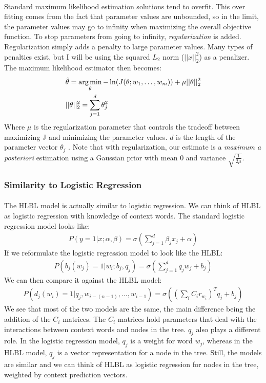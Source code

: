 \paragraph{}
Standard maximum likelihood estimation solutions tend to overfit. This over fitting comes from the fact that parameter values are unbounded, so in the limit, the parameter values may go to infinity when maximizing the overall objective function. To stop parameters from going to infinity, \emph{regularization} is added. Regularization simply adds a penalty to large parameter values. Many types of penalties exist, but I will be using the squared $L_2$ norm ($||x||^2_2$) as a penalizer. The maximum likelihood estimator then becomes:
\begin{align}
&\hat{\theta} = \operatorname*{arg\,min}_\theta -\ln(J(\theta;w_1,\dots, w_m)) +  \mu ||\theta||^2_2
\\
& ||\theta||^2_2 = \sum_{j=1}^d \theta_j^2 \nonumber
\end{align}
Where $\mu$ is the regularization parameter that controls the tradeoff between maximizing J and minimizing the parameter values. $d$ is the length of the parameter vector $\theta_j$ \cite{Elkan2013}. Note that with regularization, our estimate is a \emph{maximum a posteriori} estimation using a Gaussian prior with mean 0 and variance $\sqrt{\frac{1}{2\mu}}$.

\subsubsection{Similarity to Logistic Regression}
\paragraph{}
The HLBL model is actually similar to logistic regression. We can think of HLBL as logistic regression with knowledge of context words. 
The standard logistic regression model looks like:
\begin{align}
P(y =1 | x; \alpha, \beta) = \sigma \left( \sum_{j=1}^d \beta_j x_j + \alpha \right)
\end{align}
If we reformulate the logistic regression model to look like the HLBL:
\begin{align}
P( b_j(w_j) = 1 | w_i; b_j, q_j) = \sigma \left( \sum_{j=1}^d q_j w_j + b_j \right)
\end{align}
We can then compare it against the HLBL model:
\begin{align}
P(d_j(w_i) = 1 | q_j, w_{i-(n-1)},\dots, w_{i-1}) =  \sigma( (\sum_i C_i r_{w_i})^T q_{j} +b_{j})
\end{align}
We see that most of the two models are the same, the main difference being the addition of the $C_i$ matrices.  The $C_i$ matrices hold parameters that deal with the interactions between context words and nodes in the tree. $q_j$ also plays a different role. In the logistic regression model, $q_j$ is a weight for word $w_j$, whereas in the HLBL model, $q_j$ is a vector representation for a node in the tree. Still, the models are similar and we can think of HLBL as logistic regression for nodes in the tree, weighted by context prediction vectors.



